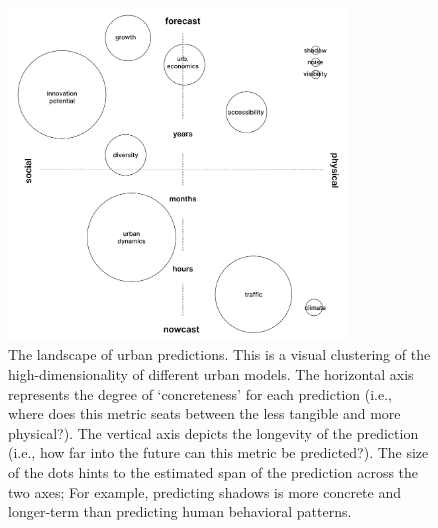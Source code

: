 {    \begin{figure}[!htb]
        \begin{center}
            \includegraphics[width=0.8\textwidth]{chapters/prediction/figures/predictions_chart.png}
        \end{center}
        \caption{The landscape of urban predictions. This is a visual clustering of the high-dimensionality of different urban models. The horizontal axis represents the degree of `concreteness' for each prediction (i.e., where does this metric seats between the less tangible and more physical?). The vertical axis depicts the longevity of the prediction (i.e., how far into the future can this metric be predicted?). The size of the dots hints to the estimated span of the prediction across the two axes; For example, predicting shadows is more concrete and longer-term than predicting human behavioral patterns.}
        \label{fig:predictions_axis}
    \end{figure}

}
